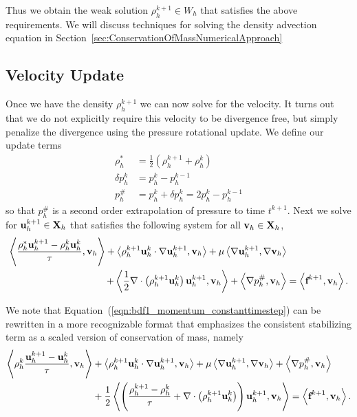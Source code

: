 \documentclass[letterpaper]{erdc}
\begin{document}
Thus we obtain the weak solution $\rho_h^{k+1}\in W_h$ that satisfies the above requirements.  We will discuss techniques for solving the density advection equation in Section~\ref{sec:ConservationOfMassNumericalApproach}

%
\subsection{Velocity Update}
Once we have the density $\rho_h^{k+1}$ we can now solve for the velocity.  It turns out that we do not explicitly require this velocity to be divergence free, but simply penalize the divergence using the pressure rotational update.  We define our update terms
\begin{align*}
  \rho_h^{*} &= \frac{1}{2}\left( \rho_h^{k+1} + \rho_h^{k} \right)\\
  \delta p_h^{k} &= p_h^{k} - p_h^{k-1}\\
    p_h^{\#} &= p_h^{k} + \delta p_h^{k} = 2p_h^{k} - p_h^{k-1}
\end{align*}
so that $p_h^{\#}$ is a second order extrapolation of pressure to time $t^{k+1}$.  Next we  solve for $\textbf{u}_h^{k+1}\in\textbf{X}_h$ that satisfies the following system for all $\textbf{v}_h\in\textbf{X}_h$,
\begin{equation}\label{eqn:bdf1_momentum_constanttimestep}
  \begin{split}
\left\langle  \frac{\rho_h^{*}\textbf{u}_h^{k+1}-\rho_h^{k}\textbf{u}_h^{k} }{\tau} , \textbf{v}_h \right\rangle + \left\langle  \rho_h^{k+1}\textbf{u}_h^{k}\cdot\nabla\textbf{u}_h^{k+1} , \textbf{v}_h \right\rangle+ \mu\left\langle  \nabla \textbf{u}_h^{k+1} , \nabla\textbf{v}_h \right\rangle&\\
 + \left\langle  \frac{1}{2}\nabla\cdot\left(\rho_h^{k+1}\textbf{u}_h^{k}\right)\textbf{u}_h^{k+1} , \textbf{v}_h \right\rangle +\left\langle \nabla p_h^{\#}, \textbf{v}_h \right\rangle &= \left\langle \textbf{f}^{k+1}, \textbf{v}_h \right\rangle.
\end{split}
\end{equation}

We note that Equation~(\ref{eqn:bdf1_momentum_constanttimestep}) can be rewritten in a more recognizable format that emphasizes the consistent stabilizing term as a scaled version of conservation of mass, namely
\begin{equation}
  \begin{split}
\left\langle \rho_h^{k} \frac{\textbf{u}_h^{k+1}-\textbf{u}_h^{k} }{\tau} , \textbf{v}_h \right\rangle &+ \left\langle  \rho_h^{k+1}\textbf{u}_h^{k}\cdot\nabla\textbf{u}_h^{k+1} , \textbf{v}_h \right\rangle + \mu\left\langle  \nabla \textbf{u}_h^{k+1} , \nabla\textbf{v}_h \right\rangle+\left\langle \nabla p_h^{\#}, \textbf{v}_h \right\rangle\\
 &+ \frac{1}{2}\left\langle  \left(\frac{\rho_h^{k+1} - \rho_h^{k}}{\tau} + \nabla\cdot\left(\rho_h^{k+1}\textbf{u}_h^{k}\right)  \right )\textbf{u}_h^{k+1} , \textbf{v}_h \right\rangle = \left\langle \textbf{f}^{k+1}, \textbf{v}_h \right\rangle.
\end{split}
\end{equation}
\end{document}
